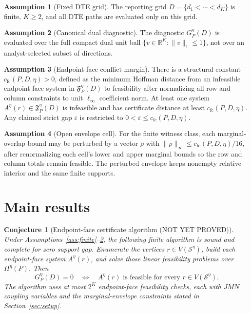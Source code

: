 \documentclass[11pt]{article}
\theoremstyle{definition}
\newtheorem{assumption}{Assumption}
\theoremstyle{plain}
\newtheorem{conjecture}{Conjecture}
\theoremstyle{remark}
\begin{document}
\begin{assumption}[Fixed DTE grid]\label{ass:grid}
The reporting grid \(D=\{d_1<\cdots<d_K\}\) is finite, \(K\ge 2\), and all DTE
paths are evaluated only on this grid.
\end{assumption}

\begin{assumption}[Canonical dual diagnostic]\label{ass:dual-diagnostic}
The diagnostic \(G^\eta_P(D)\) is evaluated over the full compact dual unit ball
\(\{v\in\mathbb R^K:\|v\|_1\le 1\}\), not over an analyst-selected subset of
directions.
\end{assumption}

\begin{assumption}[Endpoint-face conflict margin]\label{ass:face-conflict}
There is a structural constant \(c_{\mathrm{fc}}(P,D,\eta)>0\), defined as the
minimum Hoffman distance from an infeasible endpoint-face system in
\(\mathfrak F^\eta_P(D)\) to feasibility after normalizing all row and column
constraints to unit \(\ell_\infty\) coefficient norm.  At least one system
\(A^\eta(r)\in\mathfrak F^\eta_P(D)\) is infeasible and has certificate distance
at least \(c_{\mathrm{fc}}(P,D,\eta)\).  Any claimed strict gap \(\varepsilon\) is
restricted to \(0<\varepsilon\le c_{\mathrm{fc}}(P,D,\eta)\).
\end{assumption}

\begin{assumption}[Open envelope cell]\label{ass:open-envelope}
For the finite witness class, each marginal-overlap bound may be perturbed by a
vector \(\rho\) with \(\|\rho\|_\infty\le
c_{\mathrm{fc}}(P,D,\eta)/16\), after renormalizing each cell's lower and upper
marginal bounds so the row and column totals remain feasible.  The perturbed
envelope keeps nonempty relative interior and the same finite supports.
\end{assumption}

\section{Main results}
\begin{conjecture}[Endpoint-face certificate algorithm (NOT YET PROVED)]\label{conj:diagnostic}
Under Assumptions~\ref{ass:finite}--\ref{ass:dual-diagnostic}, the following
finite algorithm is sound and complete for zero support gap.  Enumerate the
vertices \(r\in V(\mathcal S^\eta)\), build each endpoint-face system
\(A^\eta(r)\), and solve those linear feasibility problems over
\(\Pi^\eta(P)\).  Then
\[
G^\eta_P(D)=0
\quad\Longleftrightarrow\quad
A^\eta(r)\text{ is feasible for every }r\in V(\mathcal S^\eta).
\]
The algorithm uses at most \(2^K\) endpoint-face feasibility checks, each with
\(JMN\) coupling variables and the marginal-envelope constraints stated in
Section~\ref{sec:setup}.
\end{conjecture}
\end{document}
